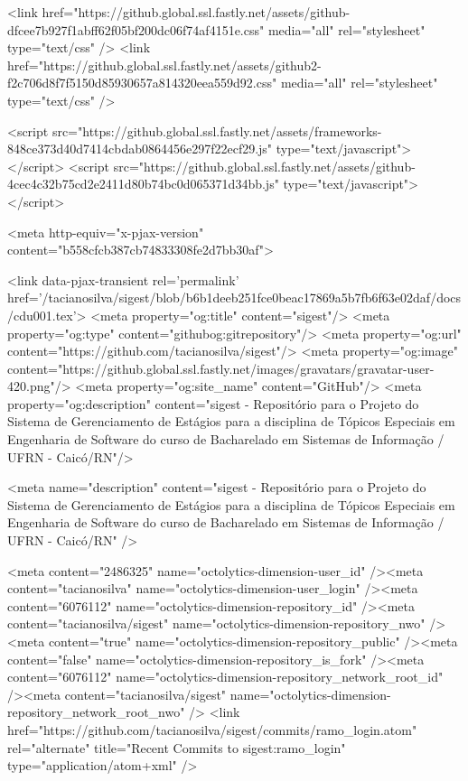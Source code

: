     <link href="https://github.global.ssl.fastly.net/assets/github-dfcee7b927f1abff62f05bf200dc06f74af4151e.css" media="all" rel="stylesheet" type="text/css" />
    <link href="https://github.global.ssl.fastly.net/assets/github2-f2c706d8f7f5150d85930657a814320eea559d92.css" media="all" rel="stylesheet" type="text/css" />
    

    

      <script src="https://github.global.ssl.fastly.net/assets/frameworks-848ce373d40d7414cbdab0864456e297f22ecf29.js" type="text/javascript"></script>
      <script src="https://github.global.ssl.fastly.net/assets/github-4cec4c32b75cd2e2411d80b74bc0d065371d34bb.js" type="text/javascript"></script>
      
      <meta http-equiv="x-pjax-version" content="b558cfcb387cb74833308fe2d7bb30af">

        <link data-pjax-transient rel='permalink' href='/tacianosilva/sigest/blob/b6b1deeb251fce0beac17869a5b7fb6f63e02daf/docs/cdu001.tex'>
  <meta property="og:title" content="sigest"/>
  <meta property="og:type" content="githubog:gitrepository"/>
  <meta property="og:url" content="https://github.com/tacianosilva/sigest"/>
  <meta property="og:image" content="https://github.global.ssl.fastly.net/images/gravatars/gravatar-user-420.png"/>
  <meta property="og:site_name" content="GitHub"/>
  <meta property="og:description" content="sigest - Repositório para o Projeto do Sistema de Gerenciamento de Estágios para a disciplina de Tópicos Especiais em Engenharia de Software do curso de Bacharelado em Sistemas de Informação / UFRN - Caicó/RN"/>

  <meta name="description" content="sigest - Repositório para o Projeto do Sistema de Gerenciamento de Estágios para a disciplina de Tópicos Especiais em Engenharia de Software do curso de Bacharelado em Sistemas de Informação / UFRN - Caicó/RN" />

  <meta content="2486325" name="octolytics-dimension-user_id" /><meta content="tacianosilva" name="octolytics-dimension-user_login" /><meta content="6076112" name="octolytics-dimension-repository_id" /><meta content="tacianosilva/sigest" name="octolytics-dimension-repository_nwo" /><meta content="true" name="octolytics-dimension-repository_public" /><meta content="false" name="octolytics-dimension-repository_is_fork" /><meta content="6076112" name="octolytics-dimension-repository_network_root_id" /><meta content="tacianosilva/sigest" name="octolytics-dimension-repository_network_root_nwo" />
  <link href="https://github.com/tacianosilva/sigest/commits/ramo_login.atom" rel="alternate" title="Recent Commits to sigest:ramo_login" type="application/atom+xml" />

